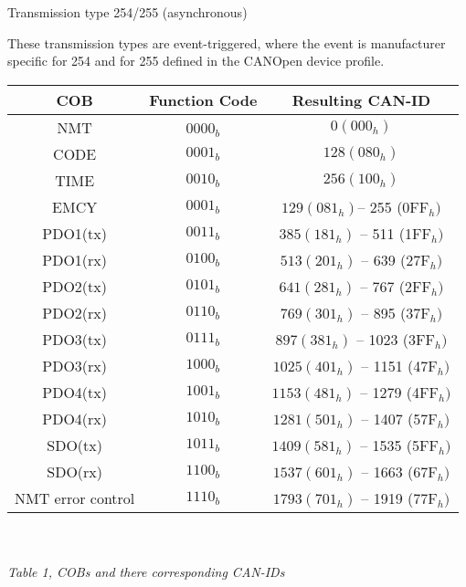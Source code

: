 Transmission type 254/255 (asynchronous)

These transmission types are event-triggered, where the event is manufacturer specific for 254 and for 255 defined in the CANOpen device profile.



\begin{tabular}{|c|c|c|}
	\hline 
	\textbf{COB} & \textbf{Function Code} & \textbf{Resulting CAN-ID} \\ 
	\hline 
	NMT &  0000$_{b}$  & $0 (000_{h})$  \\ 
	\hline 
	CODE & $0001_{b}$ &  $128 (080_{h})$\\ 
	\hline 
	TIME & $0010_{b}$ &  $256 (100_{h})$\\ 
	\hline 
	EMCY & $0001_{b}$ &   $129 (081_{h}) $–  255 (0FF$_{h})$ \\ 
	\hline 
	PDO1(tx) & $0011_{b}$ &  $385 (181_{h}) $ – 511 (1FF$_{h})$\\ 
	\hline 
	PDO1(rx) & $0100_{b}$ &  $513 (201_{h}) $ –  639 (27F$_{h})$\\ 
	\hline 
	PDO2(tx) & $0101_{b}$ &  $641 (281_{h}) $ –  767 (2FF$_{h})$\\ 
	\hline 
	PDO2(rx) & $0110_{b}$ &  $769 (301_{h})$  –  895 (37F$_{h})$\\ 
	\hline 
	PDO3(tx) & $0111_{b}$ &  $897 (381_{h}) $ – 1023 (3FF$_{h})$\\ 
	\hline 
	PDO3(rx) & $1000_{b}$ &  $1025 (401_{h}) $ –  1151 (47F$_{h})$\\ 
	\hline 
	PDO4(tx) & $1001_{b}$ &  $1153 (481_{h}) $ –  1279 (4FF$_{h})$\\ 
	\hline 
	PDO4(rx) & $1010_{b}$ & $1281 (501_{h}) $ –  1407 (57F$_{h})$\\ 
	\hline 
	SDO(tx) & $1011_{b}$ & $ 1409 (581_{h}) $ –  1535 (5FF$_{h})$\\ 
	\hline 
	SDO(rx) & $1100_{b}$ & $1537 (601_{h}) $ –  1663 (67F$_{h})$\\ 
	\hline 
	NMT error control &$ 1110_{b} $& $ 1793 (701_{h}) $ –  1919 (77F$_{h})$\\ 
	\hline 
\end{tabular} 
\\
\\
\textit{Table 1, COBs and there corresponding CAN-IDs}







